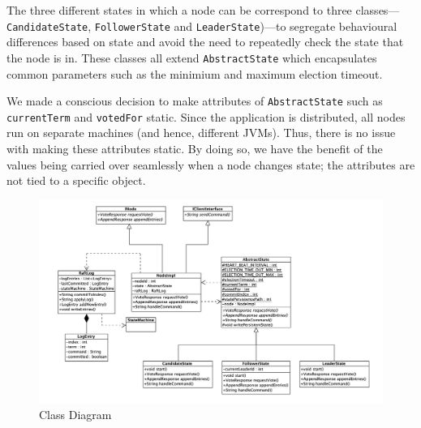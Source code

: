 \documentclass[12pt, a4paper]{article}
\begin{document}
The three different states in which a node can be correspond to three classes---\texttt{CandidateState}, \texttt{FollowerState} and \texttt{LeaderState})---to segregate behavioural differences based on state and avoid the need to repeatedly check the state that the node is in. These classes all extend \texttt{AbstractState} which encapsulates common parameters such as the minimium and maximum election timeout.

We made a conscious decision to make attributes of \texttt{AbstractState} such as \texttt{currentTerm} and \texttt{votedFor} static. Since the application is distributed, all nodes run on separate machines (and hence, different JVMs). Thus, there is no issue with making these attributes static. By doing so, we have the benefit of the values being carried over seamlessly when a node changes state; the attributes are not tied to a specific object.

\begin{figure}[htp]
  \centering
  \includegraphics[width=1\textwidth]{img/class-diragram.png}
  \caption{Class Diagram}
  \label{fig:aofc}
\end{figure}
\end{document}
